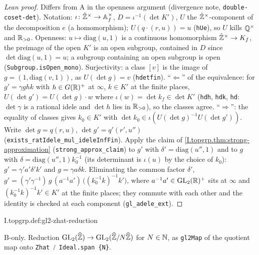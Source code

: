 \begin{proof}[Lean proof]
Differs from A in the openness argument (divergence note, \texttt{double-coset-det}). Notation: $\iota\colon\hat{\mathbb{Z}}^\times\to\mathbb{A}_f^\times$, $D=\iota^{-1}(\det K')$, $U$ the $\hat{\mathbb{Z}}^\times$-component of the decomposition $e$ (a homomorphism); $U(q\cdot(r,u))=u$ (\texttt{hUe}), so $U$ kills $\mathbb{Q}^\times$ and $\mathbb{R}_{>0}$. Openness: $u\mapsto\mathrm{diag}(u,1)$ is a continuous homomorphism $\hat{\mathbb{Z}}^\times\to K_f$, the preimage of the open $K'$ is an open subgroup, contained in $D$ since $\det\mathrm{diag}(u,1)=u$; a subgroup containing an open subgroup is open (\texttt{Subgroup.isOpen\_mono}). Surjectivity: a class $[v]$ is the image of $g=(1,\mathrm{diag}(v,1))$, as $U(\det g)=v$ (\texttt{hdetfin}). ``$\Leftarrow$'' of the equivalence: for $g'=\gamma g h k$ with $h\in G(\mathbb{R})^+$ at $\infty$, $k\in K'$ at the finite places, $U(\det g')=U(\det g)\cdot w$ where $\iota(w)=\det k_f\in\det K'$ (\texttt{hdh}, \texttt{hdk}, \texttt{hd\gamma}: $\det\gamma$ is a rational idele and $\det h$ lies in $\mathbb{R}_{>0}$), so the classes agree. ``$\Rightarrow$'': the equality of classes gives $k_0\in K'$ with $\det k_0\in\iota(U(\det g)^{-1}U(\det g'))$. Write $\det g=q(r,u)$, $\det g'=q'(r',u'')$ (\texttt{exists\_ratIdele\_mul\_ideleInfFin}). Apply the claim of \cref{I.topgrp.thm:strong-approximation} (\texttt{strong\_approx\_claim}) to $g'$ with $\delta'=\mathrm{diag}(u'',1)$ and to $g$ with $\delta=\mathrm{diag}(u'',1)k_0^{-1}$ (its determinant is $\iota(u)$ by the choice of $k_0$): $g'=\gamma'a'\delta'k'$ and $g=\gamma a\delta k$. Eliminating the common factor $\delta'$, $g'=(\gamma'\gamma^{-1})\,g\,(a^{-1}a')\,\bigl((k_0^{-1}k)^{-1}k'\bigr)$, where $a^{-1}a'\in\mathrm{GL}_2(\mathbb{R})^+$ sits at $\infty$ and $(k_0^{-1}k)^{-1}k'\in K'$ at the finite places; they commute with each other and the identity is checked at each component (\texttt{gl\_adele\_ext}).
\end{proof}


\begin{definition}
\bonly
{}
\end{definition}
\begin{tfformal}{I.topgrp.def:gl2-zhat-reduction}
\begin{tffidelity}
B-only. Reduction $\mathrm{GL}_2(\widehat{\mathbb{Z}})\to\mathrm{GL}_2(\widehat{\mathbb{Z}}/N\widehat{\mathbb{Z}})$ for $N\in\mathbb{N}$, as \texttt{gl2Map} of the quotient map onto \texttt{Zhat ⧸ Ideal.span \{N\}}.
\end{tffidelity}
\end{tfformal}

